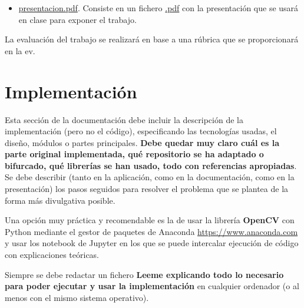 \documentclass[a4paper]{article}
\theoremstyle{plain} %
\theoremstyle{plain} %
\begin{document}
\begin{itemize}
En caso de que exista ya una implementación en un repositorio público asociado al trabajo escogido, se debe desarrollar una versión propia, haciendo una bifurcación (fork) del repositorio que incluya explicaciones, paso a paso, ejemplos, modificaciones, etc. Por ejemplo, se puede hacer un notebook de jupyter que incluya ejemplos de uso o la experimentación.
Aquí el archivo {\bf Readme} deberá referenciar bien el trabajo original y explicar la aportación propia.


\item \url{presentacion.pdf}. Consiste en un fichero \url{.pdf} con la presentación que se usará en clase para exponer el trabajo.
\end{itemize}

La evaluación del trabajo se realizará en base a una rúbrica que se proporcionará en la ev. 




\section{Implementación}

Esta sección de la documentación  debe incluir la descripción de la implementación (pero no el código), especificando las tecnologías usadas, el diseño, módulos o partes principales. \textbf{Debe quedar muy claro cuál es la parte original implementada, qué repositorio se ha adaptado o bifurcado, qué librerías se han usado,  todo con referencias apropiadas}. Se debe describir (tanto en la aplicación, como en la documentación, como en la presentación) los pasos seguidos para resolver el problema que se plantea de la forma más divulgativa posible. 

Una opción muy práctica y recomendable es la de usar la librería \textbf{OpenCV} con Python mediante el gestor de paquetes de Anaconda \url{https://www.anaconda.com} y usar los notebook de Jupyter en los que se puede intercalar ejecución de código con explicaciones teóricas. %

Siempre se debe redactar un fichero {\bf Leeme explicando todo lo necesario para poder ejecutar y usar la implementación} en cualquier ordenador (o al menos con el mismo sistema operativo).
\end{document}

